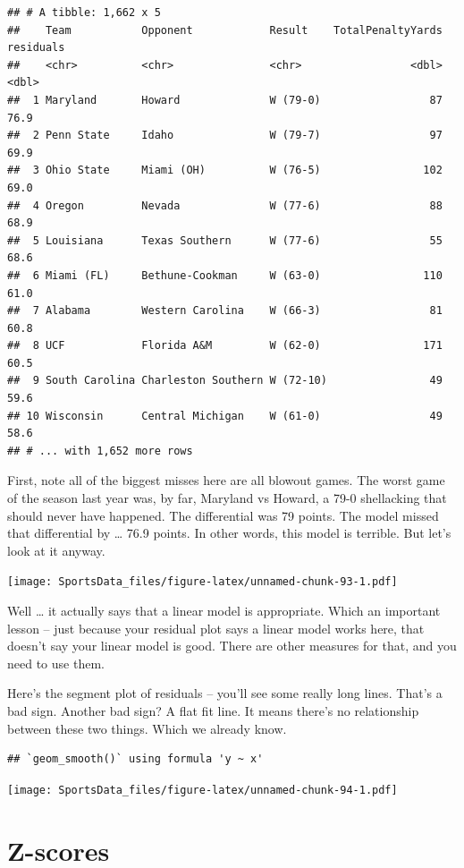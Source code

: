 \documentclass[
]{book}
\begin{document}
\begin{verbatim}
## # A tibble: 1,662 x 5
##    Team           Opponent            Result    TotalPenaltyYards residuals
##    <chr>          <chr>               <chr>                 <dbl>     <dbl>
##  1 Maryland       Howard              W (79-0)                 87      76.9
##  2 Penn State     Idaho               W (79-7)                 97      69.9
##  3 Ohio State     Miami (OH)          W (76-5)                102      69.0
##  4 Oregon         Nevada              W (77-6)                 88      68.9
##  5 Louisiana      Texas Southern      W (77-6)                 55      68.6
##  6 Miami (FL)     Bethune-Cookman     W (63-0)                110      61.0
##  7 Alabama        Western Carolina    W (66-3)                 81      60.8
##  8 UCF            Florida A&M         W (62-0)                171      60.5
##  9 South Carolina Charleston Southern W (72-10)                49      59.6
## 10 Wisconsin      Central Michigan    W (61-0)                 49      58.6
## # ... with 1,652 more rows
\end{verbatim}

First, note all of the biggest misses here are all blowout games. The worst game of the season last year was, by far, Maryland vs Howard, a 79-0 shellacking that should never have happened. The differential was 79 points. The model missed that differential by \ldots{} 76.9 points. In other words, this model is terrible. But let's look at it anyway.

\texttt{[image: SportsData\_files/figure-latex/unnamed-chunk-93-1.pdf]}

Well \ldots{} it actually says that a linear model is appropriate. Which an important lesson -- just because your residual plot says a linear model works here, that doesn't say your linear model is good. There are other measures for that, and you need to use them.

Here's the segment plot of residuals -- you'll see some really long lines. That's a bad sign. Another bad sign? A flat fit line. It means there's no relationship between these two things. Which we already know.

\begin{verbatim}
## `geom_smooth()` using formula 'y ~ x'
\end{verbatim}

\texttt{[image: SportsData\_files/figure-latex/unnamed-chunk-94-1.pdf]}

\hypertarget{z-scores}{%
\chapter{Z-scores}\label{z-scores}}
\end{document}
